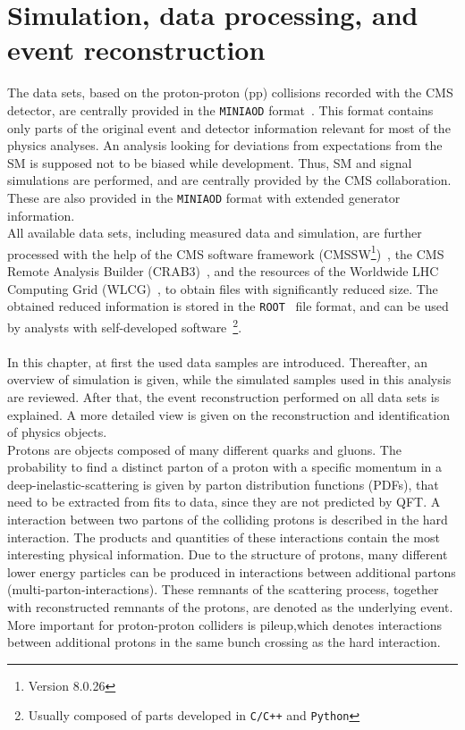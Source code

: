 \chapter{Simulation, data processing, and event reconstruction}\label{chap:reco}
\minitoc
The data sets, based on the proton-proton (pp) collisions recorded with the CMS detector, are centrally provided in the \texttt{MINIAOD} format~\cite{MiniAOD}. This format contains only parts of the original event and detector information relevant for most of the physics analyses. An analysis looking for deviations from expectations from the SM is supposed not to be biased while development. Thus, SM and signal simulations are performed, and are centrally provided by the CMS collaboration. These are also provided in the \texttt{MINIAOD} format with extended generator information.\\
All available data sets, including measured data and simulation, are further processed with the help of the CMS software framework (CMSSW\footnote{Version 8.0.26})~\cite{CMSSW}, the CMS Remote Analysis Builder (CRAB3)~\cite{CRAB}, and the resources of the Worldwide LHC Computing Grid (WLCG)~\cite{Grid}, to obtain files with significantly reduced size. The obtained reduced information is stored in the \texttt{ROOT}~\cite{ROOT} file format, and can be used by analysts with self-developed software~\footnote{Usually composed of parts developed in \texttt{C/C++} and \texttt{Python}}.\\
\\
In this chapter, at first the used data samples are introduced. Thereafter, an overview of simulation is given, while the simulated samples used in this analysis are reviewed. After that, the event reconstruction performed on all data sets is explained. A more detailed view is given on the reconstruction and identification of physics objects.\\

Protons are objects composed of many different quarks and gluons. The probability to find a distinct parton of a proton with a specific momentum in a deep-inelastic-scattering is given by parton distribution functions (PDFs)\cite{PDF}, that need to be extracted from fits to data, since they are not predicted by QFT.
A interaction between two partons of the colliding protons is described in the hard interaction. The products and quantities of these interactions contain the most interesting physical information. Due to the structure of protons, many different lower energy particles can be produced in interactions between additional partons (multi-parton-interactions). These remnants of the scattering process, together with reconstructed remnants of the protons, are denoted as the underlying event. More important for proton-proton colliders is pileup,which denotes interactions between additional protons in the same bunch crossing as the hard interaction.

